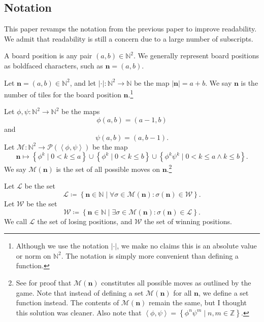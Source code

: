 \documentclass[11pt, letterpaper]{article}
\begin{document}
\subsection{Notation}
This paper revamps the notation from the previous paper to improve readability. We admit that readability is still a concern due to a large number of subscripts.
\begin{definition}\label{dfn:1}
	A board position is any pair $(a,b)\in\mathbb{N}^2$. We generally represent board positions as boldfaced characters, such as $\mathbf{n}=(a,b)$.
\end{definition}
\begin{definition}\label{dfn:2}
	Let $\mathbf{n}=(a,b)\in\mathbb{N}^2$, and let $\left| \cdot  \right| : \mathbb{N}^2 \to \mathbb{N}$ be the map $\left| \mathbf{n} \right| =a+b$. We say $\mathbf{n}$ is the number of tiles for the board position $\mathbf{n}$.\footnote{Although we use the notation $\left| \cdot  \right| $, we make no claims this is an absolute value or norm on $\mathbb{N}^2$. The notation is simply more convenient than defining a function.}
\end{definition}
\begin{definition}[Moves]\label{dfn:3}
	Let $\phi ,\psi : \mathbb{N}^2 \to \mathbb{N}^2$ be the maps
	\[
		\phi (a,b)=(a-1,b)
	\]
	and
	\[
		\psi (a,b)=(a,b-1)
	.\]
	Let $\mathscr{M}  : \mathbb{N}^2 \to \mathcal{P} \left( \left<\phi ,\psi  \right> \right) $ be the map
	\[
		\mathbf{n}\mapsto \left\{ \phi ^k \mid 0<k\leq a \right\} \cup \left\{\phi ^k \mid 0<k\leq b \right\}\cup \left\{ \phi ^k\psi ^k \mid 0<k\leq a\land k\leq b \right\} 
	.\]
	We say $\mathscr{M}  (\mathbf{n})$ is the set of all possible moves on $\mathbf{n}$.\footnote{See \cite{exc} for proof that $\mathscr{M}  (\mathbf{n})$ constitutes all possible moves as outlined by the game. Note that instead of defining a set $\mathscr{M} (\mathbf{n})$ for all $\mathbf{n}$, we define a set function instead. The contents of $\mathscr{M} (\mathbf{n})$ remain the same, but I thought this solution was cleaner. Also note that $\left<\phi ,\psi  \right> = \left\{ \phi^n\psi ^m \mid n,m\in\mathbb{Z} \right\} $.}
\end{definition}
\begin{definition}\label{dfn:4}
	Let $\mathcal{L} $ be the set
	\[
		\mathcal{L} \coloneqq \left\{ \mathbf{n}\in\mathbb{N} \mid \forall \sigma \in \mathscr{M} (\mathbf{n}): \sigma (\mathbf{n})\in \mathcal{W}  \right\} 
	.\]
	Let $\mathcal{W} $ be the set
	\[
		\mathcal{W} \coloneqq \left\{ \mathbf{n}\in\mathbb{N} \mid \exists \sigma \in \mathscr{M} (\mathbf{n}): \sigma (\mathbf{n})\in \mathcal{L}  \right\} 
	.\]
	We call $\mathcal{L} $ the set of losing positions, and $\mathcal{W} $ the set of winning positions.
\end{definition}
\end{document}
